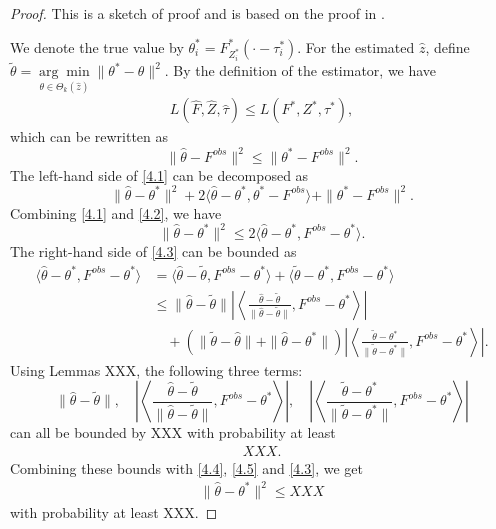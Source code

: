 \begin{proof}
This is a sketch of proof and is based on the proof in \cite{Gao2015b}.

We denote the true value by $\theta^*_i = F^*_{Z_i^*}(\cdot - \tau_i^*)$. 
For the estimated $\hat z$, define $ \tilde \theta = \underset{\theta\in\Theta_k(\hat z)}{\arg\min} \| \theta^* - \theta\|^2 $.
By the definition of the estimator, we  have
\begin{align*}
L(\hat F, \hat Z, \hat \tau) \leq L(F^*, Z^*, \tau^*),
\end{align*}
which can be rewritten as
\begin{equation}\label{4.1}
\| \hat \theta - F^{obs}\|^2 \leq \|\theta^* - F^{obs}\|^2.
\end{equation}
The left-hand side of \eqref{4.1} can be decomposed as
\begin{equation}\label{4.2}
\| \hat \theta - \theta^*\|^2 + 2\langle \hat \theta - \theta^*, \theta^* - F^{obs} \rangle + \| \theta^* - F^{obs}\|^2.
\end{equation}
Combining \eqref{4.1} and \eqref{4.2}, we have
\begin{equation}\label{4.3}
\| \hat \theta - \theta ^* \|^2 \leq 2 \langle \hat \theta - \theta^*, F^{obs}-\theta^* \rangle.
\end{equation}
The right-hand side of \eqref{4.3} can be bounded as 
\begin{align}
\nonumber
\langle \hat \theta - \theta^*, F^{obs} - \theta^*\rangle 
&= 
\langle \hat \theta - \tilde\theta, F^{obs} - \theta^*\rangle 
+ \langle \tilde \theta - \theta^*, F^{obs} - \theta^*\rangle \\
\label{4.4}
&\leq 
\| \hat \theta - \tilde \theta \|  
\left| \left\langle \frac{\hat \theta - \tilde \theta}{\| \hat \theta - \tilde \theta \|}, F^{obs} - \theta^* \right\rangle \right|\\
\label{4.5}
& \quad + 
\left( \| \tilde \theta - \hat \theta \| +  \| \hat \theta -  \theta^* \| \right) 
\left| \left\langle \frac{\tilde \theta -  \theta^*}{\| \tilde \theta - \theta^* \|}, F^{obs} - \theta^* \right\rangle \right|.
\end{align}
Using Lemmas XXX, the following three terms:
\begin{equation}\label{4.6}
\| \hat \theta - \tilde \theta \| , 
\quad 
\left| \left\langle \frac{\hat \theta - \tilde \theta}{\| \hat \theta - \tilde \theta \|}, F^{obs} - \theta^* \right\rangle \right|,
\quad
\left| \left\langle \frac{\tilde \theta -  \theta^*}{\| \tilde \theta - \theta^* \|}, F^{obs} - \theta^* \right\rangle \right|
\end{equation}
can all be bounded by XXX with probability at least
\begin{align*}
XXX.
\end{align*}
Combining these bounds with \eqref{4.4}, \eqref{4.5}
and \eqref{4.3}, we get
\begin{align*}
\|\hat \theta - \theta^* \|^2 \leq XXX
\end{align*}
with probability at least XXX. 


\end{proof}
